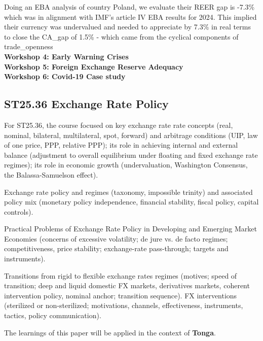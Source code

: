 \documentclass[12pt]{article}
\begin{document}
       Doing an EBA analysis of country Poland, we evaluate their REER gap is -7.3\% which was in alignment with IMF’s article IV EBA results for 2024. This implied their currency was undervalued and needed to appreciate by 7.3\% in real terms to close the CA\_gap of 1.5\% - which came from the cyclical components of trade\_openness \\
\textbf{Workshop 4: Early Warning Crises} \\

\textbf{Workshop 5: Foreign Exchange Reserve Adequacy} \\
\textbf{Workshop 6: Covid-19 Case study}	


\subsection{ST25.36 Exchange Rate Policy}

For ST25.36, the course focused on key exchange rate rate concepts (real, nominal, bilateral, multilateral, spot, forward) and arbitrage conditions (UIP, law of one price, PPP, relative PPP); its role in achieving internal and external balance (adjustment to overall equilibrium under floating and fixed exchange rate regimes); its role in economic growth (undervaluation, Washington Consensus, the Balassa-Samuelson effect).

Exchange rate policy and regimes (taxonomy, impossible trinity) and associated policy mix (monetary policy independence, financial stability, fiscal policy, capital controls).  

Practical Problems of Exchange Rate Policy in Developing and Emerging Market Economies (concerns of excessive volatility; de jure vs. de facto regimes; competitiveness, price stability; exchange-rate pass-through; targets and instruments).  

Transitions from rigid to flexible exchange rates regimes (motives; speed of transition; deep and liquid domestic FX markets, derivatives markets, coherent intervention policy, nominal anchor; transition sequence).   
FX interventions (sterilized or non-sterilized; motivations, channels, effectiveness, instruments, tactics, policy communication).  

The learnings of this paper will be applied in the context of \textbf{Tonga}.



\end{document}
